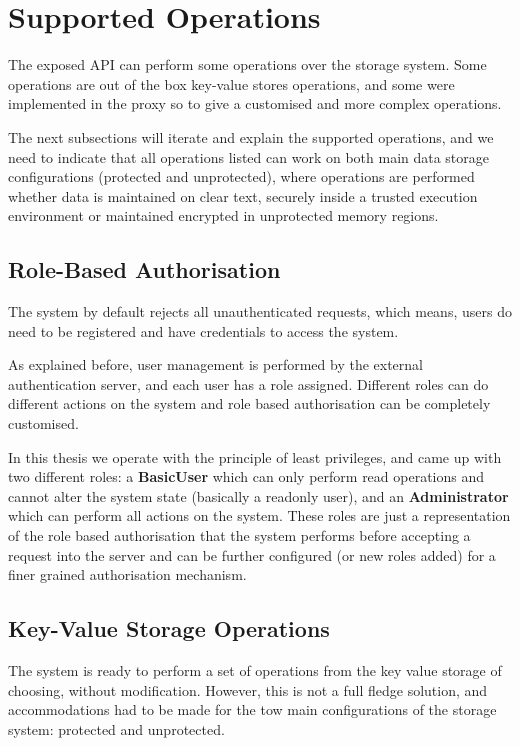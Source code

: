 \section{Supported Operations}
\label{sec:supported_operations}

The exposed \gls{API} can perform some operations over the storage system. Some operations are out of the box key-value stores operations, and some were implemented in the proxy so to give a customised and more complex operations.

The next subsections will iterate and explain the supported operations, and we need to indicate that all operations listed can work on both main data storage configurations (protected and unprotected), where operations are performed whether data is maintained on clear text, securely inside a trusted execution environment or maintained encrypted in unprotected memory regions.

\subsection{Role-Based Authorisation}
\label{ssec:role-based_authorisation}

The system by default rejects all unauthenticated requests, which means, users do need to be registered and have credentials to access the system.

As explained before, user management is performed by the external authentication server, and each user has a role assigned. Different roles can do different actions on the system and role based authorisation can be completely customised.

In this thesis we operate with the principle of least privileges, and came up with two different roles: a \textbf{BasicUser} which can only perform read operations and cannot alter the system state (basically a readonly user), and an \textbf{Administrator} which can perform all actions on the system. These roles are just a representation of the role based authorisation that the system performs before accepting a request into the server and can be further configured (or new roles added) for a finer grained authorisation mechanism.

\subsection{Key-Value Storage Operations}
\label{ssec:key-value_storage_operations}

The system is ready to perform a set of operations from the key value storage of choosing, without modification. However, this is not a full fledge solution, and accommodations had to be made for the tow main configurations of the storage system: protected and unprotected.

